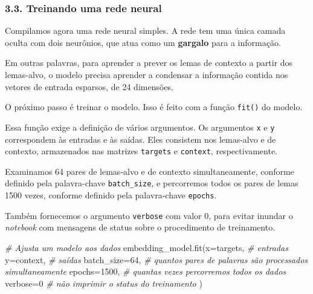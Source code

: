 \documentclass[
  brazilian,
]{article}
\newenvironment{Shaded}{}{}
\newcommand{\CommentTok}[1]{\textcolor[rgb]{0.38,0.63,0.69}{\textit{#1}}}
\newcommand{\DecValTok}[1]{\textcolor[rgb]{0.25,0.63,0.44}{#1}}
\newcommand{\NormalTok}[1]{#1}
\newcommand{\OperatorTok}[1]{\textcolor[rgb]{0.40,0.40,0.40}{#1}}
\begin{document}
\hypertarget{treinando-uma-rede-neural}{%
\subsubsection{3.3. Treinando uma rede
neural}\label{treinando-uma-rede-neural}}

Compilamos agora uma rede neural simples. A rede tem uma única camada
oculta com dois neurônios, que atua como um \textbf{gargalo} para a
informação.

Em outras palavras, para aprender a prever os lemas de contexto a partir
dos lemas-alvo, o modelo precisa aprender a condensar a informação
contida nos vetores de entrada esparsos, de 24 dimensões.

O próximo passo é treinar o modelo. Isso é feito com a função
\texttt{fit()} do modelo.

Essa função exige a definição de vários argumentos. Os argumentos
\texttt{x} e \texttt{y} correspondem às entradas e às saídas. Eles
consistem nos lemas-alvo e de contexto, armazenados nas matrizes
\texttt{targets} e \texttt{context}, respectivamente.

Examinamos 64 pares de lemas-alvo e de contexto simultaneamente,
conforme definido pela palavra-chave \texttt{batch\_size}, e percorremos
todos os pares de lemas 1500 vezes, conforme definido pela palavra-chave
\texttt{epochs}.

Também fornecemos o argumento \texttt{verbose} com valor 0, para evitar
inundar o \emph{notebook} com mensagens de status sobre o procedimento
de treinamento.

\begin{Shaded}
\begin{Highlighting}[]
\CommentTok{\# Ajusta um modelo aos dados}
\NormalTok{embedding\_model.fit(x}\OperatorTok{=}\NormalTok{targets,   }\CommentTok{\# entradas}
\NormalTok{                    y}\OperatorTok{=}\NormalTok{context,   }\CommentTok{\# saídas}
\NormalTok{                    batch\_size}\OperatorTok{=}\DecValTok{64}\NormalTok{,  }\CommentTok{\# quantos pares de palavras são processados simultaneamente}
\NormalTok{                    epochs}\OperatorTok{=}\DecValTok{1500}\NormalTok{,   }\CommentTok{\# quantas vezes percorremos todos os dados}
\NormalTok{                    verbose}\OperatorTok{=}\DecValTok{0}   \CommentTok{\# não imprimir o status do treinamento}
\NormalTok{                   )}
\end{Highlighting}
\end{Shaded}
\end{document}
